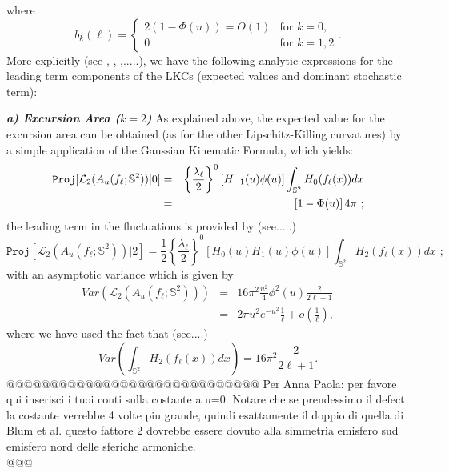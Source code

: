 \documentclass[aps,prd,showpacs,superscriptaddress,groupedaddress]{revtex4-1}  %
\begin{document}
where 
\begin{equation*}
b_{k}(\ell )=\left\{ 
\begin{array}{cc}
2(1-\Phi (u))=O(1) & \text{for }k=0, \\ 
0 & \text{for }k=1,2%
\end{array}%
\right. .
\end{equation*}%
More explicitly (see \cite{DI}, \cite{MR2015}, \cite{ROSSI2015},.....), we have the following analytic expressions for the leading term components of the LKCs (expected values and dominant stochastic term):

\vspace{0.5cm}

\emph{\bf  a) Excursion Area ($k=2$)}%
As explained above, the expected value for the excursion area can be obtained (as for the other Lipschitz-Killing curvatures) by a simple application of the Gaussian Kinematic Formula, which yields:
\begin{eqnarray*}
\mathtt{Proj}[\mathcal{L}_{2}(A_{u}(f_{\ell };\mathbb{S}^{2}))|0]&=&\left\{ 
\frac{\lambda _{\ell }}{2}\right\} ^{0}\left[ H_{-1}(u)\phi (u)\right] \int_{%
\mathbb{S}^{2}}H_{0}(f_{\ell }(x))dx
\\
&=& 
\left[ 1-\Phi (u)\right] 4\pi \text{ ;}
\end{eqnarray*}%
the leading term in the fluctuations is provided by (see.....)
\begin{equation*}
\mathtt{Proj}[\mathcal{L}_{2}(A_{u}(f_{\ell };\mathbb{S}^{2}))|2]=\frac{1}{2}%
\left\{ \frac{\lambda _{\ell }}{2}\right\} ^{0}\left[ H_{0}(u)H_{1}(u)\phi
(u)\right] \int_{\mathbb{S}^{2}}H_{2}(f_{\ell }(x))dx\text{ ;}
\end{equation*}
with an asymptotic variance which is given by 
\begin{eqnarray*}
 Var\left( \mathcal{L}_{2}(A_{u}(f_{\ell };\mathbb{S}^{2})) \right) 
 &=& 16 \pi^2 \frac{u^2}{4}\phi^2(u)\frac{2}{2\ell+1} \\
 &=& 2\pi u^2e^{-u^2}\frac{1}{\ell} + o(\frac{1}{\ell}),
 \end{eqnarray*}
where we have used the fact that (see....) 
\begin{equation}\label{Varh2}
    Var\left( \int_{\mathbb{S}^{2}}H_{2}(f_{\ell }(x))dx \right) = 16 \pi^2\frac{2}{2\ell + 1}.
 \end{equation}
@@@@@@@@@@@@@@@@@@@@@@@@@@@@@
Per Anna Paola: per favore qui inserisci i tuoi conti sulla costante a u=0. Notare che se prendessimo il defect la costante verrebbe 4 volte piu grande, quindi esattamente il doppio di quella di Blum et al. questo fattore 2 dovrebbe essere dovuto alla simmetria emisfero sud emisfero nord delle sferiche armoniche.\\@@@
\end{document}
